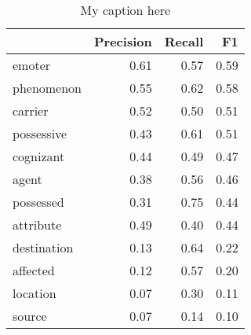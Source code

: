 \begin{table}[!ht]
\centering
\begin{tabular}{lrrr}
\toprule
{} &  Precision &  Recall &   F1 \\
\midrule
emoter      &       0.61 &    0.57 & 0.59 \\
phenomenon  &       0.55 &    0.62 & 0.58 \\
carrier     &       0.52 &    0.50 & 0.51 \\
possessive  &       0.43 &    0.61 & 0.51 \\
cognizant   &       0.44 &    0.49 & 0.47 \\
agent       &       0.38 &    0.56 & 0.46 \\
possessed   &       0.31 &    0.75 & 0.44 \\
attribute   &       0.49 &    0.40 & 0.44 \\
destination &       0.13 &    0.64 & 0.22 \\
affected    &       0.12 &    0.57 & 0.20 \\
location    &       0.07 &    0.30 & 0.11 \\
source      &       0.07 &    0.14 & 0.10 \\
\bottomrule
\end{tabular}
\caption{My caption here}
\label{tab:PARTICIPANT_ROLE_MOST_USED-oe-combined-F1}
\end{table}